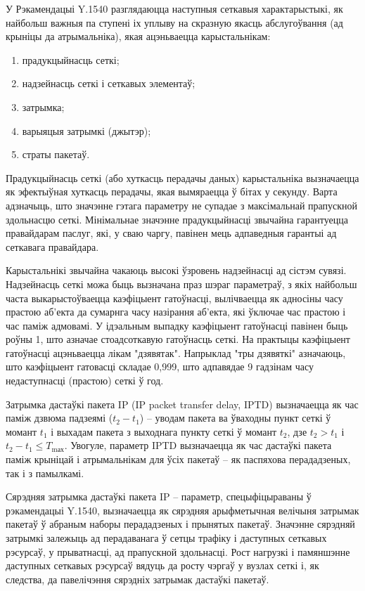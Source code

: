 У Рэкамендацыі Y.1540 разглядаюцца наступныя сеткавыя характарыстыкі, як найбольш важныя па ступені іх уплыву на скразную якасць абслугоўвання (ад крыніцы да атрымальніка), якая ацэньваецца карыстальнікам:
\begin{enumerate}
    \item прадукцыйнасць сеткі;
    \item надзейнасць сеткі і сеткавых элементаў;
    \item затрымка;
    \item варыяцыя затрымкі (джытэр);
    \item страты пакетаў.
\end{enumerate}

Прадукцыйнасць сеткі (або хуткасць перадачы даных) карыстальніка вызначаецца як эфектыўная хуткасць перадачы, якая вымяраецца ў бітах у секунду. Варта адзначыць, што значэнне гэтага параметру не супадае з максімальнай прапускной здольнасцю сеткі. Мінімальнае значэнне прадукцыйнасці звычайна гарантуецца правайдарам паслуг, які, у сваю чаргу, павінен мець адпаведныя гарантыі ад сеткавага правайдара.

Карыстальнікі звычайна чакаюць высокі ўзровень надзейнасці ад сістэм сувязі. Надзейнасць сеткі можа быць вызначана праз шэраг параметраў, з якіх найбольш часта выкарыстоўваецца каэфіцыент гатоўнасці, вылічваецца як адносіны часу прастою аб'екта да сумарнга часу назірання аб'екта, які ўключае час прастою і час паміж адмовамі. У ідэальным выпадку каэфіцыент гатоўнасці павінен быць роўны 1, што азначае стоадсоткавую гатоўнасць сеткі. На практыцы каэфіцыент гатоўнасці ацэньваецца лікам "дзявятак". Напрыклад "тры дзявяткі" азначаюць, што каэфіцыент гатовасці складае 0,999, што адпавядае 9 гадзінам часу недаступнасці (прастою) сеткі ў год.

Затрымка дастаўкі пакета IP (IP packet transfer delay, IPTD) вызначаецца як час паміж дзвюма падзеямі ($t_2 - t_1$) -- уводам пакета ва ўваходны пункт сеткі ў момант $t_1$ і выхадам пакета з выходнага пункту сеткі ў момант $t_2$, дзе $t_2 > t_1$ і $t_2 - t_1 \le T_\text{mах}$. Увогуле, параметр IPTD вызначаецца як час дастаўкі пакета паміж крыніцай і атрымальнікам для ўсіх пакетаў -- як паспяхова перададзеных, так і з памылкамі.

Сярэдняя затрымка дастаўкі пакета IP -- параметр, спецыфіцыраваны ў рэкамендацыі Y.1540, вызначаецца як сярэдняя арыфметычная велічыня затрымак пакетаў ў абраным наборы перададзеных і прынятых пакетаў. Значэнне сярэдняй затрымкі залежыць ад перадаванага ў сетцы трафіку і даступных сеткавых рэсурсаў, у прыватнасці, ад прапускной здольнасці. Рост нагрузкі і памяншэнне даступных сеткавых рэсурсаў вядуць да росту чэргаў у вузлах сеткі і, як следства, да павелічэння сярэдніх затрымак дастаўкі пакетаў.

